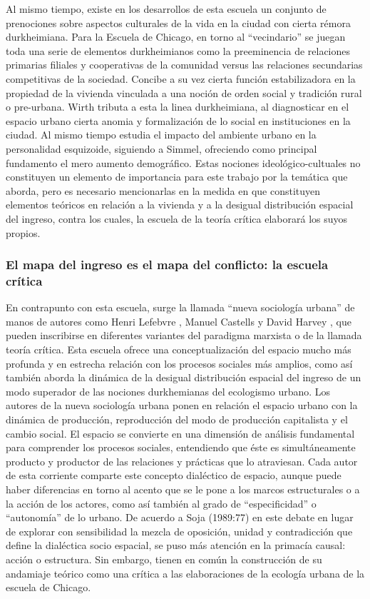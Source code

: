 Al mismo tiempo, existe en los desarrollos de esta escuela un conjunto de prenociones sobre aspectos culturales de la vida en la ciudad con cierta rémora durkheimiana. Para la Escuela de Chicago, en torno al “vecindario” se juegan toda una serie de elementos durkheimianos como la preeminencia de relaciones primarias filiales y cooperativas de la comunidad versus las relaciones secundarias competitivas de la sociedad. Concibe a su vez cierta función estabilizadora en la propiedad de la vivienda vinculada a una noción de orden social y tradición rural o pre-urbana. Wirth tributa a esta la linea durkheimiana, al diagnosticar en el espacio urbano cierta anomia y formalización de lo social en instituciones en la ciudad. Al mismo tiempo estudia el impacto del ambiente urbano en la personalidad esquizoide, siguiendo a Simmel, ofreciendo como principal fundamento el mero aumento demográfico. Estas nociones ideológico-cultuales no constituyen un elemento de importancia para este trabajo por la temática que aborda, pero es necesario mencionarlas en la medida en que constituyen elementos teóricos en relación a la vivienda y a la desigual distribución espacial del ingreso, contra los cuales, la escuela de la teoría crítica elaborará los suyos propios. 

\subsubsection{El mapa del ingreso es el mapa del conflicto: la escuela crítica}

En contrapunto con esta escuela, surge la llamada “nueva sociología urbana” de manos de autores como Henri Lefebvre \citeyear{lefebvre}, Manuel Castells \citeyear{castells} y David Harvey \citeyear{harvey}, que pueden inscribirse en diferentes variantes del paradigma marxista o de la llamada teoría crítica. Esta escuela ofrece una conceptualización del espacio mucho más profunda y en estrecha relación con los procesos sociales más amplios, como así también aborda la dinámica de la desigual distribución espacial del ingreso de un modo superador de las nociones durkhemianas del ecologismo urbano. Los autores de la nueva sociología urbana ponen en relación el espacio urbano con la dinámica de producción, reproducción del modo de producción capitalista y el cambio social. El espacio se convierte en una dimensión de análisis fundamental para comprender los procesos sociales, entendiendo que éste es simultáneamente producto y productor de las relaciones y prácticas que lo atraviesan. Cada autor de esta corriente comparte este concepto dialéctico de espacio, aunque puede haber diferencias en torno al acento que se le pone a los marcos estructurales o a la acción de los actores, como así también al grado de “especificidad” o “autonomía” de lo urbano. De acuerdo a Soja (1989:77) en este debate en lugar de explorar con sensibilidad la mezcla de oposición, unidad y contradicción que define la dialéctica socio espacial, se puso más atención en la primacía causal: acción o estructura. Sin embargo, tienen en común la construcción de su andamiaje teórico como una crítica a las elaboraciones de la ecología urbana de la escuela de Chicago. 

